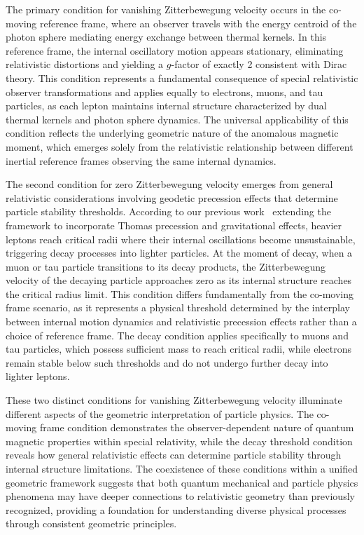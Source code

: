 \documentclass[%
 reprint,
 amsmath,amssymb,
 aps,
]{revtex4-1}
\numberwithin{equation}{section}%
\begin{document}
The primary condition for vanishing Zitterbewegung velocity occurs in the co-moving reference frame, where an observer travels with the energy centroid of the photon sphere mediating energy exchange between thermal kernels. In this reference frame, the internal oscillatory motion appears stationary, eliminating relativistic distortions and yielding a $g$-factor of exactly 2 consistent with Dirac theory. This condition represents a fundamental consequence of special relativistic observer transformations and applies equally to electrons, muons, and tau particles, as each lepton maintains internal structure characterized by dual thermal kernels and photon sphere dynamics. The universal applicability of this condition reflects the underlying geometric nature of the anomalous magnetic moment, which emerges solely from the relativistic relationship between different inertial reference frames observing the same internal dynamics.

The second condition for zero Zitterbewegung velocity emerges from general relativistic considerations involving geodetic precession effects that determine particle stability thresholds. According to our previous work~\cite{hanamura2501.0130} extending the framework to incorporate Thomas precession and gravitational effects, heavier leptons reach critical radii where their internal oscillations become unsustainable, triggering decay processes into lighter particles. At the moment of decay, when a muon or tau particle transitions to its decay products, the Zitterbewegung velocity of the decaying particle approaches zero as its internal structure reaches the critical radius limit. This condition differs fundamentally from the co-moving frame scenario, as it represents a physical threshold determined by the interplay between internal motion dynamics and relativistic precession effects rather than a choice of reference frame. The decay condition applies specifically to muons and tau particles, which possess sufficient mass to reach critical radii, while electrons remain stable below such thresholds and do not undergo further decay into lighter leptons.

These two distinct conditions for vanishing Zitterbewegung velocity illuminate different aspects of the geometric interpretation of particle physics. The co-moving frame condition demonstrates the observer-dependent nature of quantum magnetic properties within special relativity, while the decay threshold condition reveals how general relativistic effects can determine particle stability through internal structure limitations. The coexistence of these conditions within a unified geometric framework suggests that both quantum mechanical and particle physics phenomena may have deeper connections to relativistic geometry than previously recognized, providing a foundation for understanding diverse physical processes through consistent geometric principles.
\end{document}
